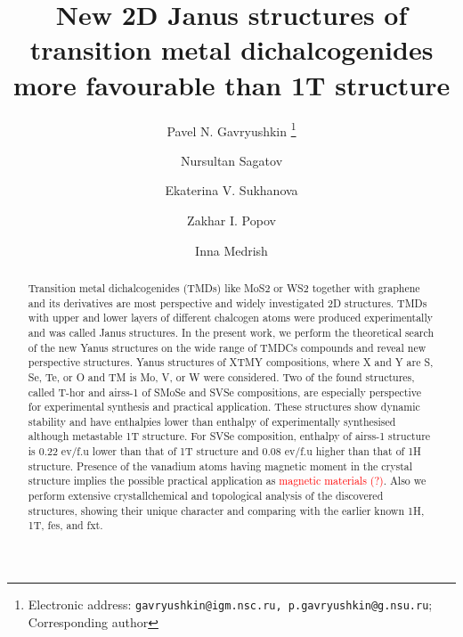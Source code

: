 \documentclass[a4paperm]{article}
\begin{document}

\title{New 2D Janus structures of transition metal dichalcogenides more favourable than 1T structure}


\author[1,2,3]{Pavel N. Gavryushkin
   \thanks{Electronic address: \texttt{gavryushkin@igm.nsc.ru, p.gavryushkin@g.nsu.ru}; Corresponding author}}     
\author[2]{Nursultan Sagatov}
\author[1]{Ekaterina V. Sukhanova}
\author[1]{Zakhar I. Popov}
\author[4]{Inna Medrish}



\date{}
\maketitle


\begin{abstract}
Transition metal dichalcogenides (TMDs) like MoS2 or WS2 together with graphene and its derivatives are most perspective and widely investigated 2D structures.
TMDs with upper and lower layers of different chalcogen atoms were produced experimentally and was called Janus structures.
In the present work, we perform the theoretical search of the new Yanus structures on the  wide range of TMDCs compounds and reveal new perspective structures.
Yanus structures of XTMY compositions, where X and Y are S, Se, Te, or O and TM is Mo, V, or W were considered.
Two of the found structures, called T-hor and airss-1 of SMoSe and SVSe compositions, are especially perspective for experimental synthesis and practical application.
These structures show dynamic stability and have enthalpies lower than enthalpy of experimentally synthesised although metastable 1T structure.
For  SVSe composition, enthalpy of airss-1 structure is 0.22 ev/f.u lower than that of 1T structure and 0.08  ev/f.u higher than that of  1H structure.
Presence of the vanadium atoms having magnetic moment in the crystal structure implies the possible practical application as \textcolor{red}{magnetic materials (?)}.
Also we perform extensive crystallchemical and topological analysis of the discovered structures, showing their unique character and comparing with the earlier known 1H, 1T, fes, and fxt.

\end{abstract}
\end{document}

